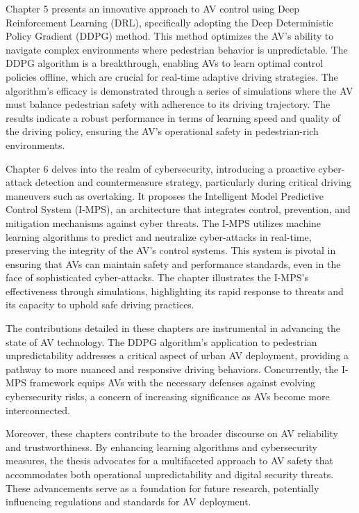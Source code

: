 Chapter 5 presents an innovative approach to AV control using Deep Reinforcement Learning (DRL), specifically adopting the Deep Deterministic Policy Gradient (DDPG) method. This method optimizes the AV's ability to navigate complex environments where pedestrian behavior is unpredictable. The DDPG algorithm is a breakthrough, enabling AVs to learn optimal control policies offline, which are crucial for real-time adaptive driving strategies. The algorithm's efficacy is demonstrated through a series of simulations where the AV must balance pedestrian safety with adherence to its driving trajectory. The results indicate a robust performance in terms of learning speed and quality of the driving policy, ensuring the AV's operational safety in pedestrian-rich environments.

Chapter 6 delves into the realm of cybersecurity, introducing a proactive cyber-attack detection and countermeasure strategy, particularly during critical driving maneuvers such as overtaking. It proposes the Intelligent Model Predictive Control System (I-MPS), an architecture that integrates control, prevention, and mitigation mechanisms against cyber threats. The I-MPS utilizes machine learning algorithms to predict and neutralize cyber-attacks in real-time, preserving the integrity of the AV's control systems. This system is pivotal in ensuring that AVs can maintain safety and performance standards, even in the face of sophisticated cyber-attacks. The chapter illustrates the I-MPS's effectiveness through simulations, highlighting its rapid response to threats and its capacity to uphold safe driving practices.

The contributions detailed in these chapters are instrumental in advancing the state of AV technology. The DDPG algorithm's application to pedestrian unpredictability addresses a critical aspect of urban AV deployment, providing a pathway to more nuanced and responsive driving behaviors. Concurrently, the I-MPS framework equips AVs with the necessary defenses against evolving cybersecurity risks, a concern of increasing significance as AVs become more interconnected.

Moreover, these chapters contribute to the broader discourse on AV reliability and trustworthiness. By enhancing learning algorithms and cybersecurity measures, the thesis advocates for a multifaceted approach to AV safety that accommodates both operational unpredictability and digital security threats. These advancements serve as a foundation for future research, potentially influencing regulations and standards for AV deployment.

